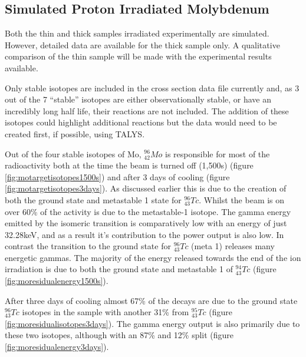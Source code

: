 \subsection{Simulated Proton Irradiated Molybdenum}

Both the thin and thick samples irradiated experimentally are simulated.  However, detailed data are available for the thick sample only.  A qualitative comparison of the thin sample will be made with the experimental results available.

Only stable isotopes are included in the cross section data file currently and, as 3 out of the 7 ``stable'' isotopes are either observationally stable, or have an incredibly long half life, their reactions are not included.  The addition of these isotopes could highlight additional reactions but the data would need to be created first, if possible, using TALYS.

Out of the four stable isotopes of \Gls{Mo}, ${}^{96}_{42}Mo$ is responsible for most of the radioactivity both at the time the beam is turned off (1,500s) (figure \ref{fig:motargetisotopes1500s}) and after 3 days of cooling (figure \ref{fig:motargetisotopes3days}).  As discussed earlier this is due to the creation of both the ground state and metastable 1 state for ${}^{96}_{43}Tc$.  Whilst the beam is on over 60\% of the activity is due to the metastable-1 isotope.  The gamma energy emitted by the isomeric transition is comparatively low with an energy of just 32.28keV, and as a result it's contribution to the power output is also low.  In contrast the transition to the ground state for ${}^{96}_{43}Tc$ (meta 1) releases many energetic gammas.  The majority of the energy released towards the end of the ion irradiation is due to both the ground state and metastable 1 of ${}^{94}_{43}Tc$ (figure \ref{fig:moresidualenergy1500s}).

After three days of cooling almost 67\% of the decays are due to the ground state ${}^{96}_{43}Tc$ isotopes in the sample with another 31\% from ${}^{95}_{43}Tc$ (figure \ref{fig:moresidualisotopes3days}).  The gamma energy output is also primarily due to these two isotopes, although with an 87\% and 12\% split (figure \ref{fig:moresidualenergy3days}). 

